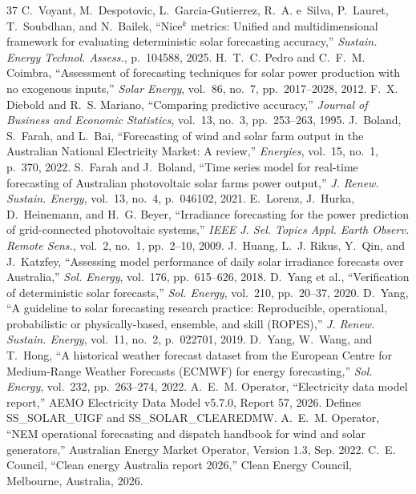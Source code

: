 \begin{thebibliography}{37}
 C.~Voyant, M.~Despotovic, L.~Garcia-Gutierrez, R.~A. e~Silva, P.~Lauret,
  T.~Soubdhan, and N.~Bailek, ``Nice$^k$ metrics: Unified and multidimensional
  framework for evaluating deterministic solar forecasting accuracy,'' {\em
  Sustain. Energy Technol. Assess.}, p.~104588, 2025.
 H.~T.~C. Pedro and C.~F.~M. Coimbra, ``Assessment of forecasting techniques for
  solar power production with no exogenous inputs,'' {\em Solar Energy},
  vol.~86, no.~7, pp.~2017--2028, 2012.
 F.~X. Diebold and R.~S. Mariano, ``Comparing predictive accuracy,'' {\em
  Journal of Business and Economic Statistics}, vol.~13, no.~3, pp.~253--263,
  1995.
 J.~Boland, S.~Farah, and L.~Bai, ``Forecasting of wind and solar farm output in the Australian National Electricity Market: A review,'' {\em Energies}, vol.~15, no.~1, p.~370, 2022.
 S.~Farah and J.~Boland, ``Time series model for real-time forecasting of Australian photovoltaic solar farms power output,'' {\em J. Renew. Sustain. Energy}, vol.~13, no.~4, p.~046102, 2021.
 E.~Lorenz, J.~Hurka, D.~Heinemann, and H.~G. Beyer, ``Irradiance forecasting for the power prediction of grid-connected photovoltaic systems,'' {\em IEEE J. Sel. Topics Appl. Earth Observ. Remote Sens.}, vol.~2, no.~1, pp.~2--10, 2009.
 J.~Huang, L.~J. Rikus, Y.~Qin, and J.~Katzfey, ``Assessing model performance of daily solar irradiance forecasts over Australia,'' {\em Sol. Energy}, vol.~176, pp.~615--626, 2018.
 D.~Yang et al., ``Verification of deterministic solar forecasts,'' {\em Sol. Energy}, vol.~210, pp.~20--37, 2020.
 D.~Yang, ``A guideline to solar forecasting research practice: Reproducible, operational, probabilistic or physically-based, ensemble, and skill (ROPES),'' {\em J. Renew. Sustain. Energy}, vol.~11, no.~2, p.~022701, 2019.
 D.~Yang, W.~Wang, and T.~Hong, ``A historical weather forecast dataset from the European Centre for Medium-Range Weather Forecasts (ECMWF) for energy forecasting,'' {\em Sol. Energy}, vol.~232, pp.~263--274, 2022.
 A.~E.~M. Operator, ``Electricity data model report,'' AEMO Electricity Data Model v5.7.0, Report 57, 2026. Defines SS\_SOLAR\_UIGF and SS\_SOLAR\_CLEAREDMW.
 A.~E.~M. Operator, ``NEM operational forecasting and dispatch handbook for wind and solar generators,'' Australian Energy Market Operator, Version 1.3, Sep. 2022.
 C.~E. Council, ``Clean energy Australia report 2026,'' Clean Energy Council, Melbourne, Australia, 2026.
\end{thebibliography}

